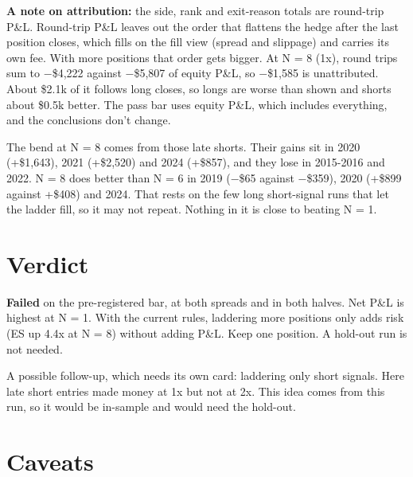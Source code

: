 \documentclass{article}
\begin{document}
\textbf{A note on attribution:} the side, rank and exit-reason totals are round-trip P\&L. Round-trip P\&L leaves out the order that flattens the hedge after the last position closes, which fills on the fill view (spread and slippage) and carries its own fee. With more positions that order gets bigger. At N = 8 (1x), round trips sum to \ensuremath{-}\$4,222 against \ensuremath{-}\$5,807 of equity P\&L, so \ensuremath{-}\$1,585 is unattributed. About \$2.1k of it follows long closes, so longs are worse than shown and shorts about \$0.5k better. The pass bar uses equity P\&L, which includes everything, and the conclusions don't change.

The bend at N = 8 comes from those late shorts. Their gains sit in 2020 (+\$1,643), 2021 (+\$2,520) and 2024 (+\$857), and they lose in 2015-2016 and 2022. N = 8 does better than N = 6 in 2019 (\ensuremath{-}\$65 against \ensuremath{-}\$359), 2020 (+\$899 against +\$408) and 2024. That rests on the few long short-signal runs that let the ladder fill, so it may not repeat. Nothing in it is close to beating N = 1.

\section{Verdict}

\textbf{Failed} on the pre-registered bar, at both spreads and in both halves. Net P\&L is highest at N = 1. With the current rules, laddering more positions only adds risk (ES up 4.4x at N = 8) without adding P\&L. Keep one position. A hold-out run is not needed.

A possible follow-up, which needs its own card: laddering only short signals. Here late short entries made money at 1x but not at 2x. This idea comes from this run, so it would be in-sample and would need the hold-out.

\section{Caveats}
\end{document}
